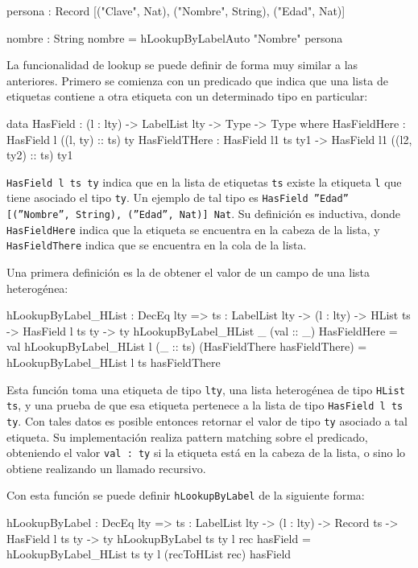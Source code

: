 \begin{code}
persona : Record [("Clave", Nat), ("Nombre", String),
  ("Edad", Nat)]

nombre : String
nombre = hLookupByLabelAuto "Nombre" persona
\end{code}

La funcionalidad de lookup se puede definir de forma muy similar a las anteriores. Primero se comienza con un predicado que indica que una lista de etiquetas contiene a otra etiqueta con un determinado tipo en particular:

\begin{code}
data HasField : (l : lty) -> LabelList lty ->
  Type -> Type where
  HasFieldHere : HasField l ((l, ty) :: ts) ty
  HasFieldTHere : HasField l1 ts ty1 ->
    HasField l1 ((l2, ty2) :: ts) ty1
\end{code}

\texttt{HasField l ts ty} indica que en la lista de etiquetas \texttt{ts} existe la etiqueta \texttt{l} que tiene asociado el tipo \texttt{ty}. Un ejemplo de tal tipo es \texttt{HasField ''Edad'' [(''Nombre'', String), (''Edad'', Nat)] Nat}. Su definición es inductiva, donde \texttt{HasFieldHere} indica que la etiqueta se encuentra en la cabeza de la lista, y \texttt{HasFieldThere} indica que se encuentra en la cola de la lista.

Una primera definición es la de obtener el valor de un campo de una lista heterogénea:

\begin{code}
hLookupByLabel_HList : DecEq lty => {ts : LabelList lty} ->
  (l : lty) -> HList ts -> HasField l ts ty -> ty
hLookupByLabel_HList _ (val :: _) HasFieldHere = val
hLookupByLabel_HList l (_ :: ts) 
  (HasFieldThere hasFieldThere) =
  hLookupByLabel_HList l ts hasFieldThere
\end{code}

Esta función toma una etiqueta de tipo \texttt{lty}, una lista heterogénea de tipo \texttt{HList ts}, y una prueba de que esa etiqueta pertenece a la lista de tipo \texttt{HasField l ts ty}. Con tales datos es posible entonces retornar el valor de tipo \texttt{ty} asociado a tal etiqueta. Su implementación realiza pattern matching sobre el predicado, obteniendo el valor \texttt{val : ty} si la etiqueta está en la cabeza de la lista, o sino lo obtiene realizando un llamado recursivo.

Con esta función se puede definir \texttt{hLookupByLabel} de la siguiente forma:

\begin{code}
hLookupByLabel : DecEq lty => {ts : LabelList lty} ->
  (l : lty) -> Record ts -> HasField l ts ty -> ty
hLookupByLabel {ts} {ty} l rec hasField =
  hLookupByLabel_HList {ts} {ty} l (recToHList rec) hasField
\end{code}

